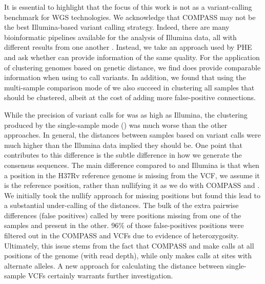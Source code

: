 It is essential to highlight that the focus of this work is not as a variant-calling benchmark for WGS technologies. We acknowledge that COMPASS may not be the best Illumina-based variant calling strategy. Indeed, there are many bioinformatic pipelines available for the analysis of \mtb{} Illumina data, all with different results from one another \cite{walter2020}. Instead, we take an approach used by PHE and ask whether \ont{} can provide information of the same quality. For the application of clustering \mtb{} genomes based on genetic distance, we find \ont{} does provide comparable information when using \bcftools{} to call variants. In addition, we found that using the multi-sample comparison mode of \pandora{} we also succeed in clustering all samples that should be clustered, albeit at the cost of adding more false-positive connections. 

While the precision of variant calls for \pandora{} was as high as Illumina, the clustering produced by the single-sample mode () was much worse than the other approaches. In general, the distances between samples based on \pandora{}  variant calls were much higher than the Illumina data implied they should be. One point that contributes to this difference is the subtle difference in how we generate the \pandora{}  consensus sequences. The main difference compared to \bcftools{} and Illumina is that when a position in the H37Rv reference genome is missing from the \pandora{}  VCF, we assume it is the reference position, rather than nullifying it as we do with COMPASS and \bcftools{}. We initially took the nullify approach for missing positions but found this lead to a substantial under-calling of the distances. The bulk of the extra pairwise differences (false positives) called by \pandora{}  were positions missing from one of the samples and present in the other. 96\% of those false-positives positions were filtered out in the COMPASS and \bcftools{} VCFs due to evidence of heterozygosity. Ultimately, this issue stems from the fact that COMPASS and \bcftools{} make calls at all positions of the genome (with read depth), while \pandora{} only makes calls at sites with alternate alleles. A new approach for calculating the distance between \pandora{} single-sample VCFs certainly warrants further investigation.

